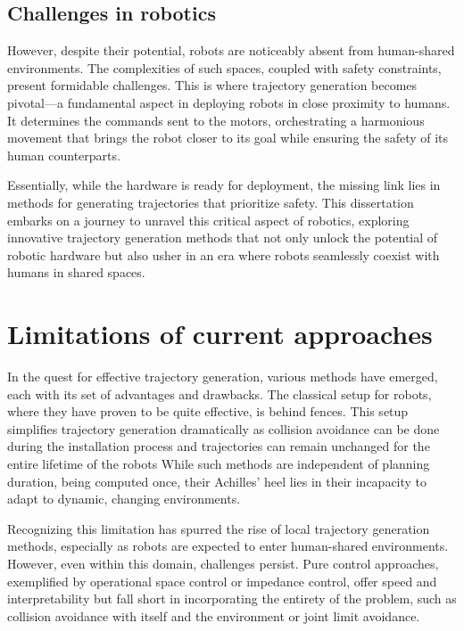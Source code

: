 \subsection{Challenges in robotics}

However, despite their potential, robots are noticeably absent from human-shared
environments. The complexities of such spaces, coupled with safety constraints,
present formidable challenges. This is where trajectory generation becomes
pivotal—a fundamental aspect in deploying robots in close proximity to humans.
It determines the commands sent to the motors, orchestrating a harmonious
movement that brings the robot closer to its goal while ensuring the safety of
its human counterparts.

Essentially, while the hardware is ready for deployment, the missing link lies
in methods for generating trajectories that prioritize safety. This dissertation
embarks on a journey to unravel this critical aspect of robotics, exploring
innovative trajectory generation methods that not only unlock the potential of
robotic hardware but also usher in an era where robots seamlessly coexist with
humans in shared spaces.

\section{Limitations of current approaches}

In the quest for effective trajectory generation, various
methods have emerged, each with its set of advantages and
drawbacks. The classical setup for robots, where they have
proven to be quite effective, is behind fences. This setup
simplifies trajectory generation dramatically as collision
avoidance can be done during the installation process and
trajectories can remain unchanged for the entire lifetime of
the robots While such methods are independent of planning
duration, being computed once, their Achilles' heel lies in
their incapacity to adapt to dynamic, changing environments.

Recognizing this limitation has spurred the rise of local
trajectory generation methods, especially as robots are
expected to enter human-shared environments. However, even
within this domain, challenges persist. Pure control
approaches, exemplified by operational space control or
impedance control, offer speed and interpretability but fall
short in incorporating the entirety of the problem, such as
collision avoidance with itself and the environment or
joint limit avoidance.

